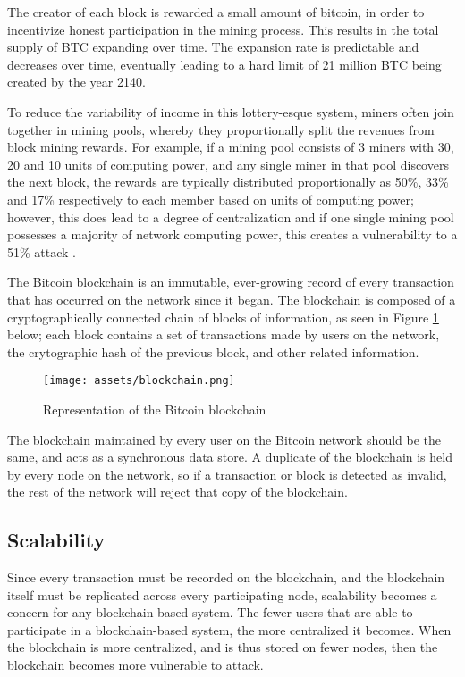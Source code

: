\documentclass[12pt]{report}
\begin{document}
The creator of each block is rewarded a small amount of bitcoin, in order to incentivize honest participation in the mining process. This results in the total supply of BTC expanding over time. The expansion rate is predictable and decreases over time, eventually leading to a hard limit of 21 million BTC being created by the year 2140. %

To reduce the variability of income in this lottery-esque system, miners often join together in mining pools, whereby they proportionally split the revenues from block mining rewards. For example, if a mining pool consists of 3 miners with 30, 20 and 10 units of computing power, and any single miner in that pool discovers the next block, the rewards are typically distributed proportionally as 50\%, 33\% and 17\% respectively to each member based on units of computing power; however, this does lead to a degree of centralization and if one single mining pool possesses a majority of network computing power, this creates a vulnerability to a 51\% attack \cite{Tschorsch.2016}.

The Bitcoin blockchain is an immutable, ever-growing record of every transaction that has occurred on the network since it began. The blockchain is composed of a cryptographically connected chain of blocks of information, as seen in Figure \ref{fig:blockchain} below; each block contains a set of transactions made by users on the network, the crytographic hash of the previous block, and other related information. 

\begin{figure}[h!]
\texttt{[image: assets/blockchain.png]}
\caption{Representation of the Bitcoin blockchain}
\label{fig:blockchain}
\end{figure}

The blockchain maintained by every user on the Bitcoin network should be the same, and acts as a synchronous data store. A duplicate of the blockchain is held by every node on the network, so if a transaction or block is detected as invalid, the rest of the network will reject that copy of the blockchain.

\subsection{Scalability}
Since every transaction must be recorded on the blockchain, and the blockchain itself must be replicated across every participating node, scalability becomes a concern for any blockchain-based system. The fewer users that are able to participate in a blockchain-based system, the more centralized it becomes. When the blockchain is more centralized, and is thus stored on fewer nodes, then the blockchain becomes more vulnerable to attack.
\end{document}
